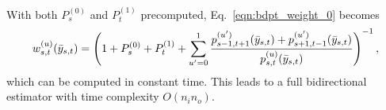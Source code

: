 \documentclass[11pt]{article}
\begin{document}
With both $P^{(0)}_s$ and $P^{(1)}_t$ precomputed, Eq.~\eqref{eqn:bdpt_weight_0} becomes
%
\begin{equation}
\small
\label{eqn:bdpt_weight_1}
w^{(u)}_{s, t}(\bar{y}_{s,t})
= \left(1 + P^{(0)}_s + P^{(1)}_t +
\sum_{u'=0}^1 \frac{p^{(u')}_{s - 1, t + 1}(\bar{y}_{s,t}) + p^{(u')}_{s + 1, t - 1}(\bar{y}_{s,t})}{p^{(u)}_{s,t}(\bar{y}_{s,t})}\right)^{-1},
\end{equation}
%
which can be computed in constant time.
This leads to a full bidirectional estimator with time complexity $O(n_i n_o)$.
\end{document}
